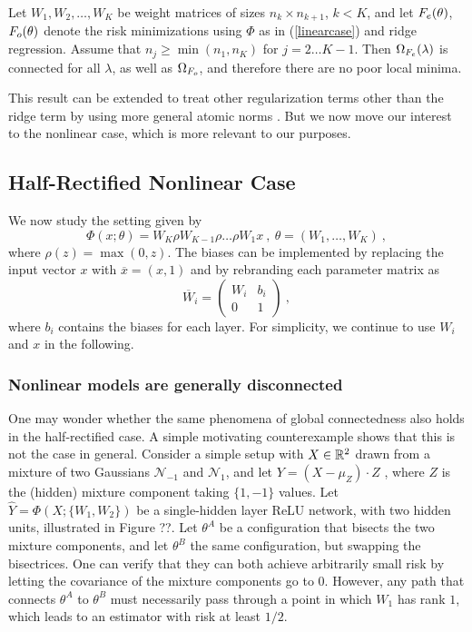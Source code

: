 \begin{proposition}
\label{proplinear}
Let $W_1, W_2, \dots, W_K$ be weight matrices of sizes 
$n_k \times n_{k+1}$, $k < K$, and let $F_{e}(\theta)$, $F_{o}(\theta)$ 
denote the risk minimizations using $\Phi$ as in (\ref{linearcase}) and ridge regression.
Assume that $n_j \geq \min(n_1, n_K)$ for $j=2 \dots K-1$.
Then $\Omega_{F_{e}}(\lambda)$ is connected for all $\lambda$, as well as $\Omega_{F_{o}}$, 
and therefore there are no poor local minima.  
\end{proposition}
This result can be extended to treat other regularization terms other than the ridge term 
by using more general atomic norms \cite{bachatomic}. But we now move our interest to the nonlinear case, which is more relevant to our purposes. 

\subsection{Half-Rectified Nonlinear Case}

We now study the setting given by 
\begin{equation}
\label{relucase}
\Phi(x;\theta) = W_K \rho W_{K-1} \rho \dots \rho W_1 x~,~\theta = (W_1, \dots, W_K)~,
\end{equation}
where $\rho(z) = \max(0 ,z)$. 
The biases can be implemented by replacing the input vector $x$ 
with $\overline{x}=(x, 1)$ and by rebranding each parameter matrix as 
$$\overline{W}_i = \left( 
\begin{array}{c|c}
W_i & b_i \\
\hline 
0 & 1 
\end{array}
\right)~,$$
where $b_i$ contains the biases for each layer.	
For simplicity, we continue to use $W_i$ and $x$ in the following.

\subsubsection{Nonlinear models are generally disconnected}

One may wonder whether the same phenomena of global connectedness also holds 
in the half-rectified case. A simple motivating counterexample shows that this is not the case in 
general. Consider a simple setup with $X \in {\mathbb{R}}^2$ drawn from a mixture of two Gaussians $\mathcal{N}_{-1}$ 
and $\mathcal{N}_{1}$, and let $Y = (X-\mu_Z) \cdot Z $ , where $Z$ is the (hidden) mixture component taking $\{1,-1\}$ values.  Let 
$\hat{Y} = \Phi(X; \{ W_1, W_2\} )$ be a single-hidden layer ReLU network, with two hidden units, 
illustrated in Figure ??. 
Let $\theta^A$ be a configuration that bisects the two mixture components, 
and let $\theta^B$ the same configuration, but swapping the bisectrices. 
One can verify that they can both achieve arbitrarily small risk by letting the covariance of the mixture components go to $0$. 
However, any path that connects $\theta^A$ to $\theta^B$ 
must necessarily pass through a point in which $W_1$ has rank $1$, which leads to an estimator with risk at least $1/2$.  


